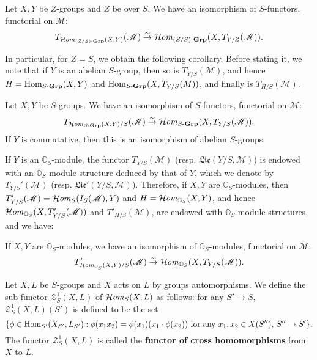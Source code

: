 \begin{proposition}\label{scheme group tangent bundle of sHom_Z/S isomorphism}
Let $X,Y$ be $Z$-groups and $Z$ be over $S$. We have an isomorphism of $S$-functors, functorial on $\mathscr{M}$:
\[T_{\operatorname{\mathcal{H}\hspace*{-0.4pt}\textit{om}\hspace{0.5pt}}_{(Z/S)\textup{-}\mathbf{Grp}}(X,Y)}(\mathscr{M})\stackrel{\sim}{\to}\operatorname{\mathcal{H}\hspace*{-0.4pt}\textit{om}\hspace{0.5pt}}_{(Z/S)\textup{-}\mathbf{Grp}}(X,T_{Y/Z}(\mathscr{M})).\]
\end{proposition}

In particular, for $Z=S$, we obtain the following corollary. Before stating it, we note that if $Y$ is an abelian $S$-group, then so is $T_{Y/S}(\mathscr{M})$, and hence $H=\mathrm{Hom}_{S\textup{-}\mathbf{Grp}}(X,Y)$ and $\mathrm{Hom}_{S\textup{-}\mathbf{Grp}}(X,T_{Y/S}(M))$, and finally is $T_{H/S}(\mathscr{M})$.

\begin{corollary}\label{scheme group tangent bundle of sHom isomorphism}
Let $X,Y$ be $S$-groups. We have an isomorphism of $S$-functors, functorial on $\mathscr{M}$:
\[T_{\operatorname{\mathcal{H}\hspace*{-0.4pt}\textit{om}\hspace{0.5pt}}_{S\textup{-}\mathbf{Grp}}(X,Y)/S}(\mathscr{M})\stackrel{\sim}{\to} \operatorname{\mathcal{H}\hspace*{-0.4pt}\textit{om}\hspace{0.5pt}}_{S\textup{-}\mathbf{Grp}}(X,T_{Y/S}(\mathscr{M})).\]
If $Y$ is commutative, then this is an isomorphism of abelian $S$-groups.
\end{corollary}

If $Y$ is an $\mathbb{O}_S$-module, the functor $T_{Y/S}(\mathscr{M})$ (resp. $\mathfrak{Lie}(Y/S,\mathscr{M})$) is endowed with an $\mathbb{O}_S$-module structure deduced by that of $Y$, which we denote by $T_{Y/S}'(\mathscr{M})$ (resp. $\mathfrak{Lie}'(Y/S,\mathscr{M})$). Therefore, if $X,Y$ are $\mathbb{O}_S$-modules, then $T_{Y/S}'(\mathscr{M})=\operatorname{\mathcal{H}\hspace*{-0.4pt}\textit{om}\hspace{0.5pt}}_S(I_S(\mathscr{M}),Y)$ and $H=\operatorname{\mathcal{H}\hspace*{-0.4pt}\textit{om}\hspace{0.5pt}}_{\mathbb{O}_S}(X,Y)$, and hence $\operatorname{\mathcal{H}\hspace*{-0.4pt}\textit{om}\hspace{0.5pt}}_{\mathbb{O}_S}(X,T'_{Y/S}(\mathscr{M}))$ and $T'_{H/S}(\mathscr{M})$, are endowed with $\mathbb{O}_S$-module structures, and we have:

\begin{corollary}\label{scheme group tangent bundle of sHom O_S-module isomorphism}
If $X,Y$ are $\mathbb{O}_S$-modules, we have an isomorphism of $\mathbb{O}_S$-modules, functorial on $\mathscr{M}$:
\[T'_{\operatorname{\mathcal{H}\hspace*{-0.4pt}\textit{om}\hspace{0.5pt}}_{\mathbb{O}_S}(X,Y)/S}(\mathscr{M})\stackrel{\sim}{\to} \operatorname{\mathcal{H}\hspace*{-0.4pt}\textit{om}\hspace{0.5pt}}_{\mathbb{O}_S}(X,T_{Y/S}(\mathscr{M})).\]
\end{corollary}

\begin{definition}
Let $X,L$ be $S$-groups and $X$ acts on $L$ by groups automorphisms. We define the sub-functor $\mathcal{Z}_S^1(X,L)$ of $\operatorname{\mathcal{H}\hspace*{-0.4pt}\textit{om}\hspace{0.5pt}}_S(X,L)$ as follows: for any $S'\to S$, $\mathcal{Z}_S^1(X,L)(S')$ is defined to be the set
\[\{\phi\in\mathrm{Hom}_{S'}(X_{S'},L_{S'}):\text{$\phi(x_1x_2)=\phi(x_1)(x_1\cdot\phi(x_2))$ for any $x_1,x_2\in X(S'')$, $S''\to S'$}\}.\]
The functor $\mathcal{Z}_S^1(X,L)$ is called the \textbf{functor of cross homomorphisms} from $X$ to $L$.
\end{definition}

